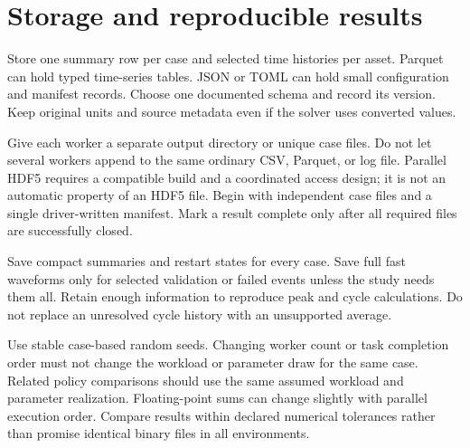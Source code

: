 \documentclass[11pt,a4paper]{report}
\begin{document}
\section{Storage and reproducible results}
Store one summary row per case and selected time histories per asset.
Parquet can hold typed time-series tables.
JSON or TOML can hold small configuration and manifest records.
Choose one documented schema and record its version.
Keep original units and source metadata even if the solver uses converted values.

Give each worker a separate output directory or unique case files.
Do not let several workers append to the same ordinary CSV, Parquet, or log file.
Parallel HDF5 requires a compatible build and a coordinated access design; it is not an automatic property of an HDF5 file.
Begin with independent case files and a single driver-written manifest.
Mark a result complete only after all required files are successfully closed.

Save compact summaries and restart states for every case.
Save full fast waveforms only for selected validation or failed events unless the study needs them all.
Retain enough information to reproduce peak and cycle calculations.
Do not replace an unresolved cycle history with an unsupported average.

Use stable case-based random seeds.
Changing worker count or task completion order must not change the workload or parameter draw for the same case.
Related policy comparisons should use the same assumed workload and parameter realization.
Floating-point sums can change slightly with parallel execution order.
Compare results within declared numerical tolerances rather than promise identical binary files in all environments.
\end{document}
